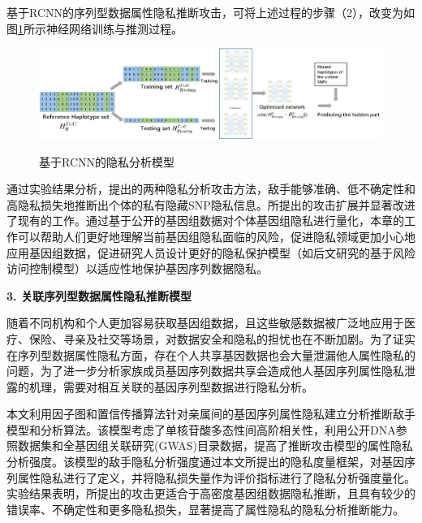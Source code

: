 \documentclass[pdftex,notypeinfo,twoside,openany,UTF8,fntef]{CASthesis}
\theoremstyle{THrm}{
	\newtheorem{question}{Question}[section]
	\newtheorem{property}{性质}[section]
	\newtheorem{assumption}{假设}[section]
	\newtheorem{claim}[lemma]{断言}
	
}
\begin{document}
基于RCNN的序列型数据属性隐私推断攻击，可将上述过程的步骤（2），改变为如图\ref{fig:rcnn_infer}所示神经网络训练与推测过程。

\begin{figure}[htbp]
	\centering
	\includegraphics[width=0.95\linewidth]{./figures/Fig3-RCNN-inference-attack.eps}\\
	\caption{基于RCNN的隐私分析模型}
	\label{fig:rcnn_infer}
\end{figure}

通过实验结果分析，提出的两种隐私分析攻击方法，敌手能够准确、低不确定性和高隐私损失地推断出个体的私有隐藏SNP隐私信息。所提出的攻击扩展并显著改进了现有的工作。通过基于公开的基因组数据对个体基因组隐私进行量化，本章的工作可以帮助人们更好地理解当前基因组隐私面临的风险，促进隐私领域更加小心地应用基因组数据，促进研究人员设计更好的隐私保护模型（如后文研究的基于风险访问控制模型）以适应性地保护基因序列数据隐私。

\textbf{3.	关联序列型数据属性隐私推断模型}

随着不同机构和个人更加容易获取基因组数据，且这些敏感数据被广泛地应用于医疗、保险、寻亲及社交等场景，对数据安全和隐私的担忧也在不断加剧。为了证实在序列型数据属性隐私方面，存在个人共享基因数据也会大量泄漏他人属性隐私的问题，为了进一步分析家族成员基因序列数据共享会造成他人基因序列属性隐私泄露的机理，需要对相互关联的基因序列型数据进行隐私分析。

本文利用因子图和置信传播算法针对亲属间的基因序列属性隐私建立分析推断敌手模型和分析算法。该模型考虑了单核苷酸多态性间高阶相关性，利用公开DNA参照数据集和全基因组关联研究(GWAS)目录数据，提高了推断攻击模型的属性隐私分析强度。该模型的敌手隐私分析强度通过本文所提出的隐私度量框架，对基因序列属性隐私进行了定义，并将隐私损失量作为评价指标进行了隐私分析强度量化。实验结果表明，所提出的攻击更适合于高密度基因组数据隐私推断，且具有较少的错误率、不确定性和更多隐私损失，显著提高了属性隐私的隐私分析推断能力。
\end{document}
